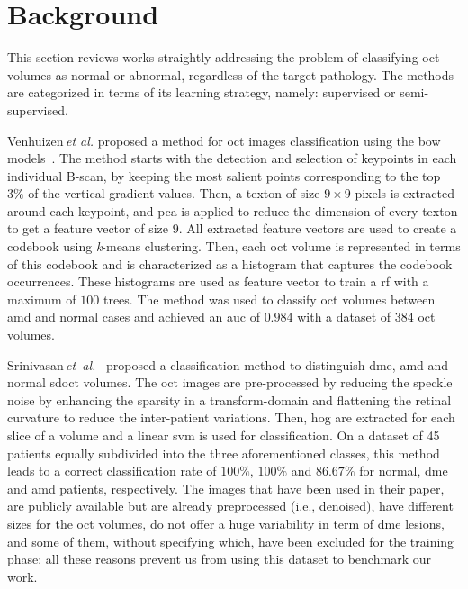 \graphicspath{ {./content/method/figures/} }
\section{Background}\label{sec:review}
This section reviews works straightly addressing the problem of classifying
\gls{oct} volumes as normal or abnormal, regardless of the target pathology.
The methods are categorized in terms of its learning strategy, namely:
supervised or semi-supervised.


Venhuizen\,\textit{et al.} proposed a method for \gls{oct} images
classification using the \gls{bow} models~\cite{Venhuizen2015}.  The method
starts with the detection and selection of keypoints in each individual
B-scan, by keeping the most salient points corresponding to the top $3 \%$
of the vertical gradient values. Then, a texton of size $9 \times 9$ pixels
is extracted around each keypoint, and \gls{pca} is applied to reduce the
dimension of every texton to get a feature vector of size $9$.  All
extracted feature vectors are used to create a codebook using
\textit{k}-means clustering.  Then, each \gls{oct} volume is represented in
terms of this codebook and is characterized as a histogram that captures
the codebook occurrences.  These histograms are used as feature vector to
train a \gls{rf} with a maximum of $100$ trees.  The method was used to
classify \gls{oct} volumes between \gls{amd} and normal cases and achieved
an \gls{auc} of $0.984$ with a dataset of $384$ \gls{oct} volumes.

Srinivasan\,\textit{et~al.}~\cite{Srinivasan2014} proposed a classification
method to distinguish \gls{dme}, \gls{amd} and normal \gls{sdoct} volumes.
The \gls{oct} images are pre-processed by reducing the speckle noise by
enhancing the sparsity in a transform-domain and flattening the retinal
curvature to reduce the inter-patient variations.  Then, \gls{hog} are
extracted for each slice of a volume and a linear \gls{svm} is used for
classification.  On a dataset of 45 patients equally subdivided into the
three aforementioned classes, this method leads to a correct classification
rate of $100 \%$, $100 \%$ and $86.67 \%$ for normal, \gls{dme} and
\gls{amd} patients, respectively.  The images that have been used in their
paper, are publicly available but are already preprocessed (i.e.,
denoised), have different sizes for the \gls{oct} volumes, do not offer a
huge variability in term of \gls{dme} lesions, and some of them, without
specifying which, have been excluded for the training phase; all these
reasons prevent us from using this dataset to benchmark our work.



